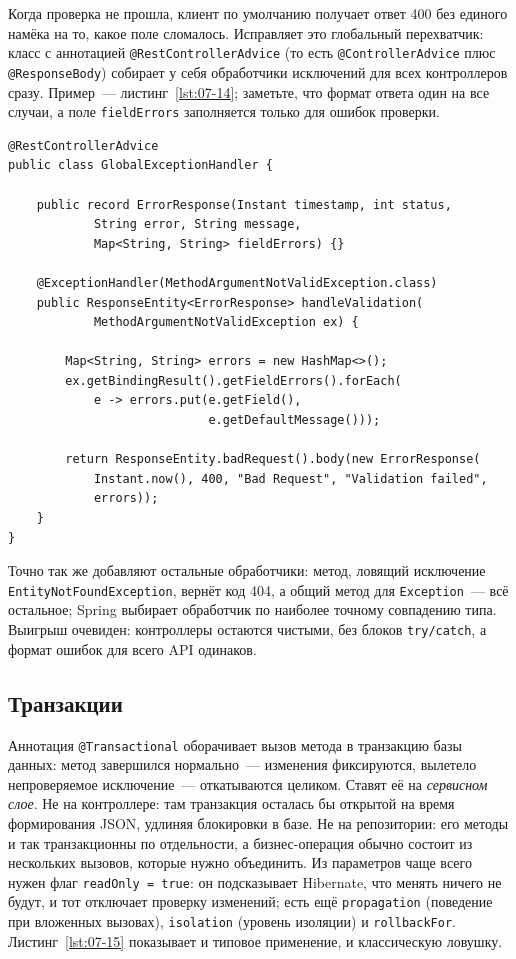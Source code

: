 Когда проверка не прошла, клиент по умолчанию получает ответ 400 без единого
намёка на то, какое поле сломалось. Исправляет это глобальный перехватчик:
класс с аннотацией \texttt{@RestControllerAdvice} (то есть
\texttt{@ControllerAdvice} плюс \texttt{@ResponseBody}) собирает у себя
обработчики исключений для всех контроллеров сразу. Пример~---
листинг~\ref{lst:07-14}; заметьте, что формат ответа один на все случаи, а
поле \texttt{fieldErrors} заполняется только для ошибок проверки.

\begin{listing}[H]
\begin{verbatim}
@RestControllerAdvice
public class GlobalExceptionHandler {

    public record ErrorResponse(Instant timestamp, int status,
            String error, String message,
            Map<String, String> fieldErrors) {}

    @ExceptionHandler(MethodArgumentNotValidException.class)
    public ResponseEntity<ErrorResponse> handleValidation(
            MethodArgumentNotValidException ex) {

        Map<String, String> errors = new HashMap<>();
        ex.getBindingResult().getFieldErrors().forEach(
            e -> errors.put(e.getField(),
                            e.getDefaultMessage()));

        return ResponseEntity.badRequest().body(new ErrorResponse(
            Instant.now(), 400, "Bad Request", "Validation failed",
            errors));
    }
}
\end{verbatim}
\caption{Глобальный обработчик исключений}
\label{lst:07-14}
\end{listing}

Точно так же добавляют остальные обработчики: метод, ловящий исключение
\texttt{EntityNotFoundException}, вернёт код 404, а общий метод для
\texttt{Exception}~--- всё остальное; Spring выбирает обработчик по наиболее
точному совпадению типа. Выигрыш очевиден: контроллеры остаются чистыми, без
блоков \texttt{try/catch}, а формат ошибок для всего API одинаков.

\subsection{Транзакции}

Аннотация \texttt{@Transactional} оборачивает вызов метода в транзакцию базы
данных: метод завершился нормально~--- изменения фиксируются, вылетело
непроверяемое исключение~--- откатываются целиком. Ставят её на
\emph{сервисном слое}. Не на контроллере: там транзакция осталась бы открытой
на время формирования JSON, удлиняя блокировки в базе. Не на репозитории: его
методы и так транзакционны по отдельности, а бизнес-операция обычно состоит из
нескольких вызовов, которые нужно объединить. Из параметров чаще всего нужен
флаг \texttt{readOnly = true}: он подсказывает Hibernate, что менять ничего не
будут, и тот отключает проверку изменений; есть ещё \texttt{propagation}
(поведение при вложенных вызовах), \texttt{isolation} (уровень изоляции) и
\texttt{rollbackFor}. Листинг~\ref{lst:07-15} показывает и типовое применение,
и классическую ловушку.

